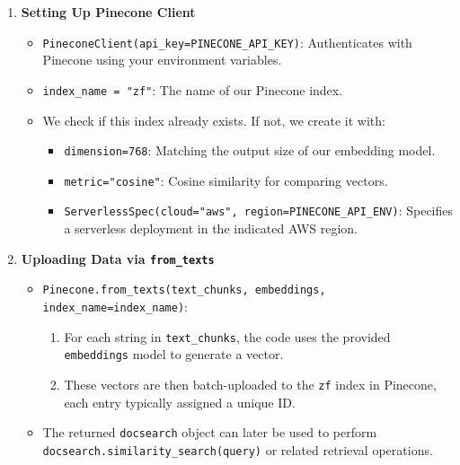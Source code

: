 \begin{enumerate}
    \item \textbf{Setting Up Pinecone Client}
    \begin{itemize}
        \item \texttt{PineconeClient(api\_key=PINECONE\_API\_KEY)}: Authenticates with Pinecone using your environment variables.
        \item \texttt{index\_name = "zf"}: The name of our Pinecone index. 
        \item We check if this index already exists. If not, we create it with:
        \begin{itemize}
            \item \texttt{dimension=768}: Matching the output size of our embedding model.
            \item \texttt{metric="cosine"}: Cosine similarity for comparing vectors.
            \item \texttt{ServerlessSpec(cloud="aws", region=PINECONE\_API\_ENV)}: Specifies a serverless deployment in the indicated AWS region.
        \end{itemize}
    \end{itemize}

    \item \textbf{Uploading Data via \texttt{from\_texts}}
    \begin{itemize}
        \item \texttt{Pinecone.from\_texts(text\_chunks, embeddings, index\_name=index\_name)}:
        \begin{enumerate}
            \item For each string in \texttt{text\_chunks}, the code uses the provided \texttt{embeddings} model to generate a vector.
            \item These vectors are then batch-uploaded to the \texttt{zf} index in Pinecone, each entry typically assigned a unique ID.
        \end{enumerate}
        \item The returned \texttt{docsearch} object can later be used to perform \texttt{docsearch.similarity\_search(query)} or related retrieval operations.
    \end{itemize}
\end{enumerate}

